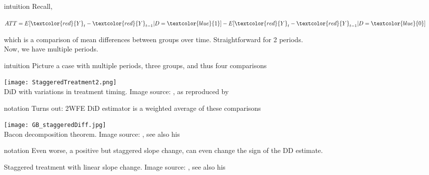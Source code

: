 \documentclass[aspectratio=169]{beamer}
\begin{document}
		\begin{frame}{intuition}
			Recall,
			\\ \vspace*{.25cm}
			\begin{center}
				\begin{math}
					ATT=E[\textcolor{red}{Y}_t - \textcolor{red}{Y}_{t-1}|D=\textcolor{blue}{1}] - E[\textcolor{red}{Y}_t-\textcolor{red}{Y}_{t-1}|D=\textcolor{blue}{0}]
				\end{math}
			\end{center}
			which is a comparison of mean differences between groups over time. Straightforward for 2 periods.
			\\ \vspace*{.25cm}
			Now, we have multiple periods.
		\end{frame}

		\begin{frame}{intuition}
			Picture a case with multiple periods, three groups, and thus four comparisons
			\begin{center}
				\texttt{[image: StaggeredTreatment2.png]}
				\\ \tiny{DiD with variations in treatment timing. Image source: \cite{Goodman-Bacon2021}, as reproduced by \href{https://andrewcbaker.netlify.app/2019/09/25/difference-in-differences-methodology/}{\underline{}}}
			\end{center}
		\end{frame}

		\begin{frame}{notation}
			Turns out: 2WFE DiD estimator is a weighted average of these comparisons
			\begin{center}
				\texttt{[image: GB\_staggeredDiff.jpg]}
				\\ \tiny{Bacon decomposition theorem. Image source: \cite{Goodman-Bacon2021}, see also his  \href{https://twitter.com/agoodmanbacon/status/1039126592604303360}{\underline{}}}
			\end{center}
		\end{frame}

		\begin{frame}{notation}
			Even worse, a positive but staggered slope change, can even change the sign of the DD estimate. \\
			\begin{centering}
				\newline \tiny{Staggered treatment with linear slope change. Image source: \cite{Goodman-Bacon2021}, see also his  \href{https://twitter.com/agoodmanbacon/status/1039126592604303360}{\underline{}}}
			\end{centering}
		\end{frame}
\end{document}
